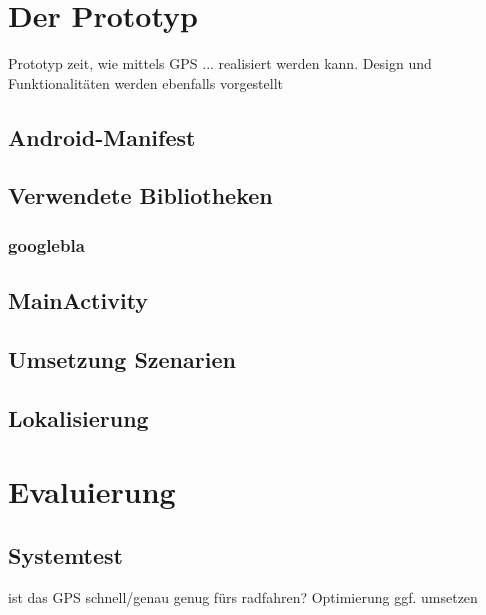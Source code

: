 \chapter{\label{chap:implementierung}Der Prototyp}
Prototyp zeit, wie mittels GPS ... realisiert werden kann.
Design und Funktionalitäten werden ebenfalls vorgestellt
\section{Android-Manifest}
\section{Verwendete Bibliotheken}
\subsection{googlebla}
\section{MainActivity}
\section{Umsetzung Szenarien}
\section{Lokalisierung}
%
%
\chapter{Evaluierung}
\section{Systemtest}
ist das GPS schnell/genau genug fürs radfahren?
Optimierung ggf. umsetzen
